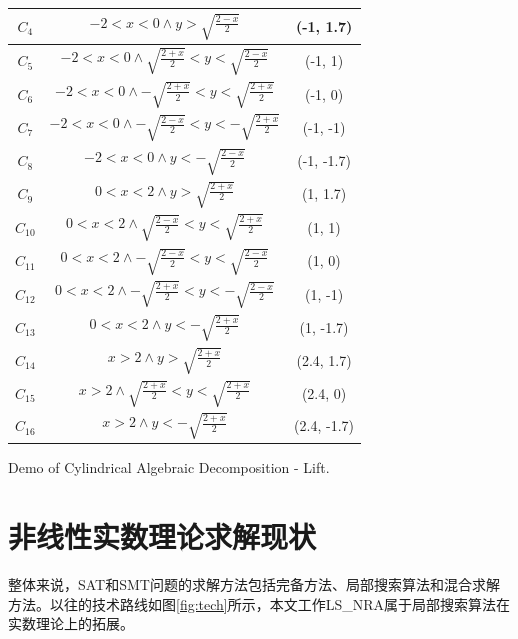 \begin{example}
\begin{enumerate}
\begin{table}[]
{\begin{tabular}{c | c | c}
            $C_4$ & $-2 < x < 0 \wedge y > \sqrt{\frac{2 - x}{2}}$ & (-1, 1.7) \\\hline
            $C_5$ & $-2 < x < 0 \wedge \sqrt{\frac{2 + x}{2}} < y < \sqrt{\frac{2 - x}{2}}$ & (-1, 1)\\\hline
            $C_6$ & $-2 < x < 0 \wedge -\sqrt{\frac{2 + x}{2}} < y < \sqrt{\frac{2 + x}{2}}$ & (-1, 0) \\\hline
            $C_7$ & $-2 < x < 0 \wedge -\sqrt{\frac{2 - x}{2}}< y < -\sqrt{\frac{2 + x}{2}}$ & (-1, -1) \\\hline
            $C_8$ & $-2 < x < 0 \wedge y < -\sqrt{\frac{2 - x}{2}}$ & (-1, -1.7) \\\hline

            $C_9$ & $0 < x < 2 \wedge y > \sqrt{\frac{2 + x}{2}}$ & (1, 1.7) \\\hline
            $C_10$ & $0 < x < 2 \wedge \sqrt{\frac{2 - x}{2}} < y < \sqrt{\frac{2 + x}{2}}$ & (1, 1) \\\hline
            $C_11$ & $0 < x < 2 \wedge -\sqrt{\frac{2 - x}{2}} < y < \sqrt{\frac{2 - x}{2}}$ & (1, 0) \\\hline
            $C_12$ & $0 < x < 2 \wedge -\sqrt{\frac{2 + x}{2}} < y < -\sqrt{\frac{2 - x}{2}}$ & (1, -1) \\\hline
            $C_13$ & $0 < x < 2 \wedge y < -\sqrt{\frac{2 + x}{2}}$ & (1, -1.7) \\\hline

            $C_14$ & $x > 2 \wedge y > \sqrt{\frac{2 + x}{2}}$ & (2.4, 1.7) \\\hline
            $C_15$ & $x > 2 \wedge \sqrt{\frac{2 + x}{2}} < y < \sqrt{\frac{2 + x}{2}}$ & (2.4, 0) \\\hline
            $C_16$ & $x > 2 \wedge y < -\sqrt{\frac{2 + x}{2}}$ & (2.4, -1.7) \\\hline
            \end{tabular}
        }
         {Demo of Cylindrical Algebraic Decomposition - Lift.}
        \label{tab:cad}
    \end{table}
\end{enumerate}
\label{ex:cad}    
\end{example}


\section{非线性实数理论求解现状}
整体来说，SAT和SMT问题的求解方法包括完备方法、局部搜索算法和混合求解方法。以往的技术路线如图\ref{fig:tech}所示，本文工作LS\_NRA属于局部搜索算法在实数理论上的拓展。

